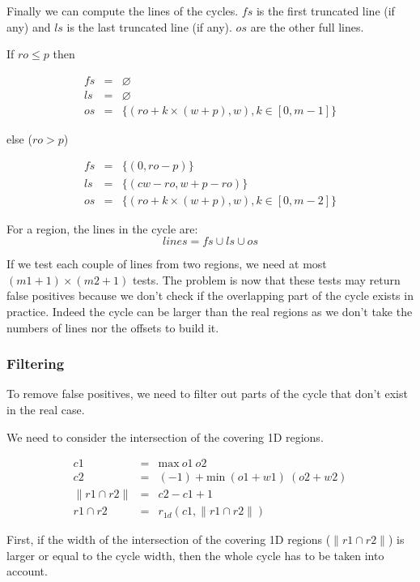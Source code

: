 \documentclass[twocolumn]{article}
\begin{document}
Finally we can compute the lines of the cycles. $fs$ is the first truncated line
(if any) and $ls$ is the last truncated line (if any). $os$ are the other
full lines.

\noindent If $ro \leq p$ then

\[
\begin{array}{rcl}
fs &=& \varnothing\\
ls &=& \varnothing\\
os &=& \{(ro+k\times (w+p), w), k \in [0,m-1]\}
\end{array}
\]

\noindent else ($ro > p$)

\[
\begin{array}{rcl}
fs &=& \{(0, ro-p)\}\\
ls &=& \{(cw-ro, w+p-ro)\}\\
os &=& \{(ro+k\times (w+p), w), k \in [0,m-2]\}
\end{array}
\]

For a region, the lines in the cycle are:
\[ lines = fs \cup ls \cup os \]

If we test each couple of lines from two regions, we need at most $(m1+1) \times
(m2+1)$ tests. The problem is now that these tests may return false positives
because we don't check if the overlapping part of the cycle exists in practice.
Indeed the cycle can be larger than the real regions as we don't take the
numbers of lines nor the offsets to build it. 

\subsubsection{Filtering}

To remove false positives, we need to filter out parts of the cycle that don't
exist in the real case.

We need to consider the intersection of the covering 1D regions.

\[
\begin{array}{rcl}
c1               &=& \textrm{max}\ o1\ o2 \\
c2               &=& (-1) + \textrm{min}\ (o1+w1)\ (o2+w2)\\
\| r1 \cap r2 \| &=& c2 - c1 + 1\\
r1 \cap r2       &=& r_{1d}(c1, \| r1 \cap r2 \|)
\end{array}
\]

First, if the width of the intersection of the covering 1D regions ($\| r1 \cap
r2 \|$) is larger or equal to the cycle width, then the whole cycle has to be
taken into account.
\end{document}
